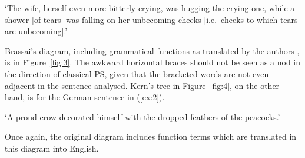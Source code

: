 \documentclass[output=paper
 	        ,biblatex
                ,babelshorthands
                ,newtxmath
                ,draftmode
                ,colorlinks, citecolor=brown
]{langscibook}
\begin{document}
\ea
\label{ex:1}
	\glt `The wife, herself even more bitterly crying, was hugging the crying one, while a shower [of tears] was falling on her unbecoming cheeks [i.e.\ cheeks to which tears are unbecoming].'
\z

Brassai's diagram, including grammatical functions as translated by the authors
\citep{ImrenyiVladar2020a-u}, is in Figure~\ref{fig:3}. The awkward horizontal braces should not be seen
as a nod in the direction of classical PS, given that the bracketed words are not even adjacent in
the sentence analysed. Kern's tree in Figure~\ref{fig:4}, on the other hand, is for the German
sentence in (\ref{ex:2}).

\ea
\label{ex:2}

\glt `A proud crow decorated himself with the dropped feathers of the peacocks.'
\z

Once again, the original diagram includes function terms which are translated in this diagram into English.
\end{document}

